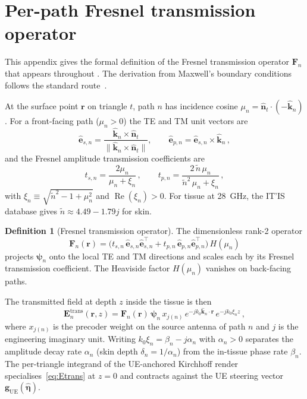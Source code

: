 \documentclass[journal,twocolumn,10pt]{IEEEtran}
\theoremstyle{plain}
\theoremstyle{definition}
\newtheorem{definition}[theorem]{Definition}
\theoremstyle{remark}
\newcommand{\EE}{\mathbf{E}}
\newcommand{\Fn}{\mathbf{F}_n}
\newcommand{\psin}{\bm{\psi}_n}
\newcommand{\ntilde}{\tilde{n}}
\DeclareMathOperator{\RE}{Re}
\begin{document}
\appendices
\section{Per-path Fresnel transmission operator}\label{app:fresnel}

This appendix gives the formal definition of the Fresnel transmission
operator $\Fn$ that appears throughout
. The derivation from Maxwell's
boundary conditions follows the standard route~\cite{BornWolf}.

At the surface point $\bm{r}$ on triangle $t$, path $n$ has
incidence cosine $\mu_n = \hat{\bm{n}}_t \cdot (-\hat{\bm{k}}_n)$.
For a front-facing path ($\mu_n > 0$) the TE and TM unit vectors are
\begin{equation}\label{eq:TE-TM-basis}
  \hat{\bm{e}}_{s,n} = \frac{\hat{\bm{k}}_n \times \hat{\bm{n}}_t}
                            {\|\hat{\bm{k}}_n \times \hat{\bm{n}}_t\|},
  \qquad
  \hat{\bm{e}}_{p,n} = \hat{\bm{e}}_{s,n} \times \hat{\bm{k}}_n\,,
\end{equation}
and the Fresnel amplitude transmission coefficients are
\begin{equation}\label{eq:fresnel-t}
  t_{s,n} = \frac{2\mu_n}{\mu_n + \xi_n}\,, \qquad
  t_{p,n} = \frac{2\,\ntilde\,\mu_n}{\ntilde^2\,\mu_n + \xi_n}\,,
\end{equation}
with $\xi_n \equiv \sqrt{\ntilde^2 - 1 + \mu_n^2}$ and
$\RE(\xi_n) > 0$. For tissue at 28~GHz, the IT'IS database gives
$\ntilde \approx 4.49 - 1.79j$ for skin.

\begin{definition}[Fresnel transmission operator]\label{def:fresnel-op}
The dimensionless rank-2 operator
\begin{equation}\label{eq:Fn-def}
  \Fn(\bm{r}) =
  \bigl(t_{s,n}\,\hat{\bm{e}}_{s,n}\hat{\bm{e}}_{s,n}^{\!\top}
       + t_{p,n}\,\hat{\bm{e}}_{p,n}\hat{\bm{e}}_{p,n}^{\!\top}\bigr)\,H(\mu_n)
\end{equation}
projects $\psin$ onto the local TE and TM directions and scales each
by its Fresnel transmission coefficient. The Heaviside factor
$H(\mu_n)$ vanishes on back-facing paths.
\end{definition}

The transmitted field at depth $z$ inside the tissue is then
\begin{equation}\label{eq:Etrans}
  \EE_n^{\mathrm{trans}}(\bm{r},z)
  = \Fn(\bm{r})\,\psin\,x_{j(n)}\,
    e^{-jk_0\hat{\bm{k}}_n\cdot\bm{r}}\,
    e^{-jk_0\xi_n z}\,,
\end{equation}
where $x_{j(n)}$ is the precoder weight on the source antenna of
path $n$ and $j$ is the engineering imaginary unit. Writing
$k_0\xi_n = \beta_n - j\alpha_n$ with $\alpha_n > 0$ separates the
amplitude decay rate $\alpha_n$ (skin depth $\delta_n = 1/\alpha_n$)
from the in-tissue phase rate $\beta_n$. The per-triangle integrand
of the UE-anchored Kirchhoff render specialises~\eqref{eq:Etrans}
at $z = 0$ and contracts against the UE steering vector
$\bm{g}_{\mathrm{UE}}(\hat{\bm{\eta}})$.
\end{document}

